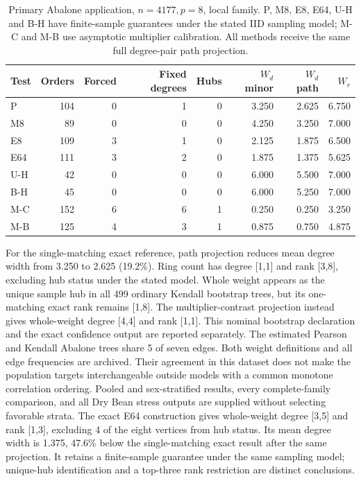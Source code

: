 \begin{table}[htbp]\centering\small
\setlength{\tabcolsep}{4pt}
\caption{Primary Abalone application, $n=4177,p=8$, local family. P, M8, E8, E64, U-H and B-H have finite-sample guarantees under the stated IID sampling model; M-C and M-B use asymptotic multiplier calibration. All methods receive the same full degree-pair path projection.}\label{tab:abalone}
\begin{lrbox}{\resultsbox}\begin{tabular}{lrrrrrrr}
\toprule
Test & Orders & Forced & Fixed degrees & Hubs & $W_d$ minor & $W_d$ path & $W_r$\\
\midrule
P & 104 & 0 & 1 & 0 & 3.250 & 2.625 & 6.750\\
M8 & 89 & 0 & 0 & 0 & 4.250 & 3.250 & 7.000\\
E8 & 109 & 3 & 1 & 0 & 2.125 & 1.875 & 6.500\\
E64 & 111 & 3 & 2 & 0 & 1.875 & 1.375 & 5.625\\
U-H & 42 & 0 & 0 & 0 & 6.000 & 5.500 & 7.000\\
B-H & 45 & 0 & 0 & 0 & 6.000 & 5.250 & 7.000\\
M-C & 152 & 6 & 6 & 1 & 0.250 & 0.250 & 3.250\\
M-B & 125 & 4 & 3 & 1 & 0.875 & 0.750 & 4.875\\
\bottomrule\end{tabular}\end{lrbox}\ifdim\wd\resultsbox>\linewidth\resizebox{\linewidth}{!}{\usebox{\resultsbox}}\else\usebox{\resultsbox}\fi\end{table}
For the single-matching exact reference, path projection reduces mean degree width from 3.250 to 2.625 (19.2\%). Ring count has degree [1,1] and rank [3,8], excluding hub status under the stated model. Whole weight appears as the unique sample hub in all 499 ordinary Kendall bootstrap trees, but its one-matching exact rank remains [1,8]. The multiplier-contrast projection instead gives whole-weight degree [4,4] and rank [1,1]. This nominal bootstrap declaration and the exact confidence output are reported separately.
The estimated Pearson and Kendall Abalone trees share 5 of seven edges. Both weight definitions and all edge frequencies are archived. Their agreement in this dataset does not make the population targets interchangeable outside models with a common monotone correlation ordering. Pooled and sex-stratified results, every complete-family comparison, and all Dry Bean stress outputs are supplied without selecting favorable strata.
The exact E64 construction gives whole-weight degree [3,5] and rank [1,3], excluding 4 of the eight vertices from hub status. Its mean degree width is 1.375, 47.6\% below the single-matching exact result after the same projection. It retains a finite-sample guarantee under the same sampling model; unique-hub identification and a top-three rank restriction are distinct conclusions.
